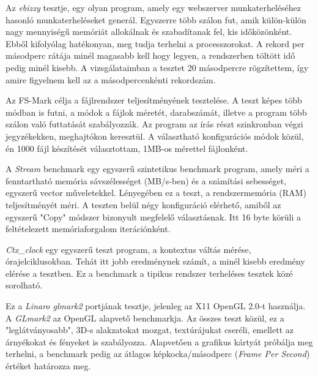 
Az \textit{ebizzy} tesztje, egy olyan program, amely egy webszerver munkaterheléséhez hasonló munkaterheléseket generál. Egyszerre több szálon fut, amik külön-külön nagy mennyiségű memóriát allokálnak és szabadítanak fel, kis időközönként. Ebből kifolyólag hatékonyan, meg tudja terhelni a processzorokat. A rekord per másodperc rátája minél magasabb kell hogy legyen, a rendszerben töltött idő pedig minél kisebb. A vizsgálataimban a tesztet 20 másodpercre rögzítettem, így amire figyelnem kell az a másodpercenkénti rekordszám.


Az FS-Mark célja a fájlrendszer teljesítményének tesztelése.
A teszt képes több módban is futni, a módok a fájlok méretét, darabszámát, illetve a program több szálon való futtatását szabályozzák. 
Az program az írás részt szinkronban végzi jegyzékekken, meghajtókon keresztül.
A választható konfigurációs módok közül, én 1000 fájl készítését választottam, 1MB-os mérettel fájlonként.


A \textit{Stream} benchmark egy egyszerű szintetikus benchmark program, amely méri a fenntartható memória sávszélességet (MB/s-ben) és a számítási sebességet, egyszerű vector műveletekkel.
Lényegében ez a teszt, a rendszermemória (RAM) teljesítményét méri.
A teszten belül négy konfiguráció elérhető, amiből az egyszerű "Copy" módszer bizonyult megfelelő választásnak.
Itt 16 byte körüli a feltételezett memóriaforgalom iterációnként.


\textit{Ctx\_clock} egy egyszerű teszt program, a kontextus váltás mérése, órajelciklusokban.
Tehát itt jobb eredménynek számít, a minél kisebb eredmény elérése a tesztben.
Ez a benchmark a tipikus rendszer terheléses tesztek közé sorolható.


Ez a \textit{Linaro glmark2} portjának tesztje, jelenleg az X11 OpenGL 2.0-t használja. A \textit{GLmark2} az OpenGL alapvető benchmarkja. Az összes teszt közül, ez a "leglátványosabb", 3D-s alakzatokat mozgat, textúrájukat cseréli, emellett az árnyékokat és fényeket is szabályozza.
Alapvetően a grafikus kártyát próbálja meg terhelni, a benchmark pedig az átlagos képkocka/másodperc (\textit{Frame Per Second}) értéket határozza meg.


